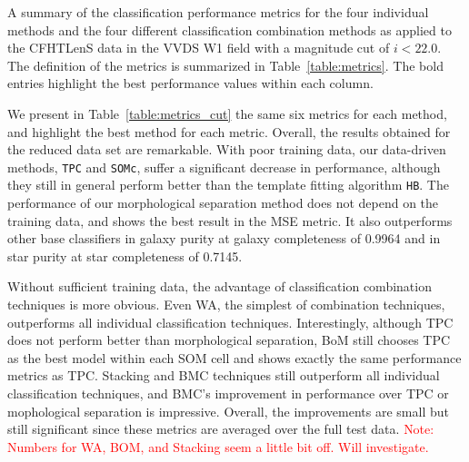 \documentclass[useAMS,usenatbib]{mn2e}
\begin{document}
\begin{table}
  \caption{A summary of the classification performance metrics
           for the four individual methods
           and the four different classification combination methods
           as applied to the CFHTLenS data in the VVDS W1 field
           with a magnitude cut of $i < 22.0$.
           The definition of the metrics is summarized in
           Table~\ref{table:metrics}.
           The bold entries highlight the best performance values
           within each column.}
  \centering
  
  \label{table:metrics_cut}
\end{table}

We present in Table~\ref{table:metrics_cut}
the same six metrics for each method,
and highlight the best method for each metric.
Overall, the results obtained for the reduced data set are remarkable.
With poor training data, our data-driven methods,
\texttt{TPC} and \texttt{SOMc},
suffer a significant decrease in performance,
although they still in general perform better than 
the template fitting algorithm
\texttt{HB}.
The performance of our morphological separation method
does not depend on the training data,
and shows the best result in the MSE metric.
It also outperforms other base classifiers
in galaxy purity at galaxy completeness of 0.9964
and in star purity at star completeness of 0.7145.

Without sufficient training data,
the advantage of classification combination techniques
is more obvious.
Even WA, the simplest of combination techniques, outperforms
all individual classification techniques.
Interestingly, although TPC does not perform better
than morphological separation,
BoM still chooses TPC as the best model within each SOM cell
and shows exactly the same performance metrics as TPC.
Stacking and BMC techniques still outperform
all individual classification techniques,
and BMC's improvement in performance over TPC or mophological separation
is impressive.
Overall, the improvements are small but still significant
since these metrics are averaged over the full test data.
\textcolor{red}{Note: Numbers for WA, BOM, and Stacking seem a little bit off.
Will investigate.}

\end{document}
